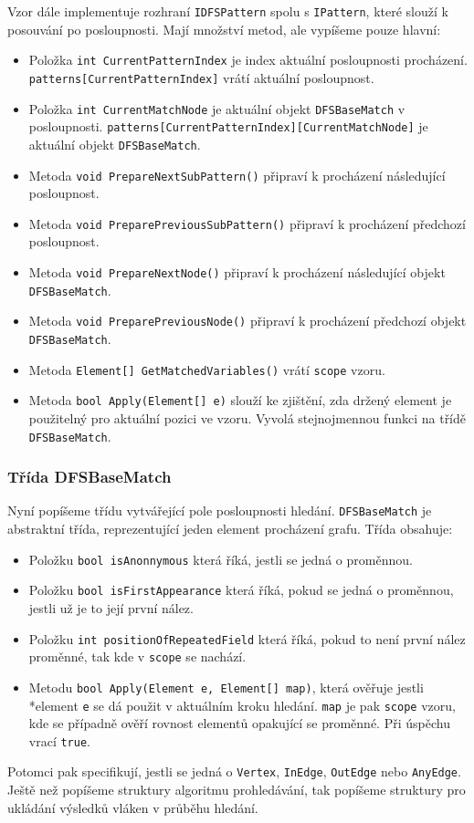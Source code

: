 Vzor dále implementuje rozhraní \texttt{IDFSPattern} spolu s \texttt{IPattern}, které slouží k posouvání po posloupnosti.
Mají množství metod, ale vypíšeme pouze hlavní:
\begin{itemize}
\item Položka \texttt{int CurrentPatternIndex} je index aktuální posloupnosti procházení.
\texttt{patterns[CurrentPatternIndex]} vrátí aktuální posloupnost.

\item Položka \texttt{int CurrentMatchNode} je aktuální objekt \texttt{DFSBaseMatch} v posloupnosti.
\texttt{patterns[CurrentPatternIndex][CurrentMatchNode]} je aktuální objekt \texttt{DFSBaseMatch}.
\item Metoda \texttt{void PrepareNextSubPattern()} připraví k procházení následující posloupnost.
\item Metoda \texttt{void PreparePreviousSubPattern()} připraví k procházení předchozí posloupnost.
\item Metoda \texttt{void PrepareNextNode()} připraví k procházení následující objekt \texttt{DFSBaseMatch}.
\item Metoda \texttt{void PreparePreviousNode()} připraví k procházení předchozí objekt \texttt{DFSBaseMatch}.
\item Metoda \texttt{Element[] GetMatchedVariables()} vrátí \texttt{scope} vzoru.
\item Metoda \texttt{bool Apply(Element[] e)} slouží ke zjištění, zda držený element je použitelný pro aktuální pozici ve vzoru.
Vyvolá stejnojmennou funkci na třídě \texttt{DFSBaseMatch}.
\end{itemize}

\subsubsection{Třída DFSBaseMatch}

Nyní popíšeme třídu vytvářející pole posloupnosti hledání.
\texttt{DFSBaseMatch} je abstraktní třída, reprezentující jeden element procházení grafu.
Třída obsahuje:
\begin{itemize}
\item Položku \texttt{bool isAnonnymous} která říká, jestli se jedná o proměnnou.
\item Položku \texttt{bool isFirstAppearance} která říká, pokud se jedná o proměnnou, jestli už je to její první nález.
\item Položku \texttt{int positionOfRepeatedField} která říká, pokud to není první nález proměnné, tak kde v \texttt{scope} se nachází. 
\item Metodu \texttt{bool Apply(Element e, Element[] map)}, která ověřuje jestli \\*element \texttt{e} se dá použit v aktuálním kroku hledání.
\texttt{map} je pak \texttt{scope} vzoru, kde se případně ověří rovnost elementů opakující se proměnné. Při úspěchu vrací \texttt{true}.
\end{itemize}
Potomci pak specifikují, jestli se jedná o \texttt{Vertex}, \texttt{InEdge}, \texttt{OutEdge} nebo \texttt{AnyEdge}.
Ještě než popíšeme struktury algoritmu prohledávání, tak popíšeme struktury pro ukládání výsledků vláken v průběhu hledání.

